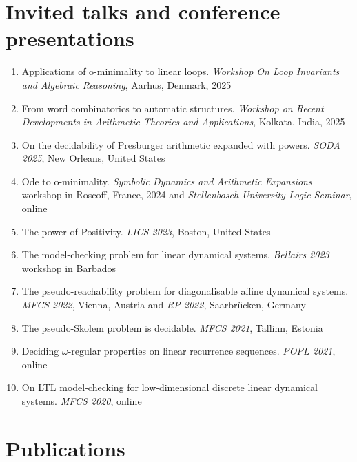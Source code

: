 \documentclass{article}
\begin{document}
	\section*{Invited talks and conference presentations}
	\begin{enumerate}
		\setlength\itemsep{0.3cm}
		\item Applications of o-minimality to linear loops. \emph{Workshop On Loop Invariants and Algebraic Reasoning}, Aarhus, Denmark, 2025
		\item From word combinatorics to automatic structures. \emph{Workshop on Recent Developments in Arithmetic Theories and Applications}, Kolkata, India, 2025
		\item On the decidability of Presburger arithmetic expanded with powers. \emph{SODA 2025}, New Orleans, United States
		\item Ode to o-minimality. \emph{Symbolic Dynamics and Arithmetic Expansions} workshop in Roscoff, France, 2024 and \emph{Stellenbosch University Logic Seminar}, online
		\item The power of Positivity. \emph{LICS 2023}, Boston, United States
		\item The model-checking problem for linear dynamical systems. \emph{Bellairs 2023} workshop in Barbados
		\item The pseudo-reachability problem for diagonalisable affine dynamical systems. \emph{MFCS 2022}, Vienna, Austria and \emph{RP 2022}, Saarbr\"ucken, Germany
		\item The pseudo-Skolem problem is decidable. \emph{MFCS 2021}, Tallinn, Estonia
		\item Deciding $\omega$-regular properties on linear recurrence sequences. \emph{POPL 2021}, online
		\item  On LTL model-checking for low-dimensional discrete
		linear dynamical systems. \emph{MFCS 2020}, online
	\end{enumerate}

		\vspace*{0.3cm}
		
        \section*{Publications}
\end{document}

